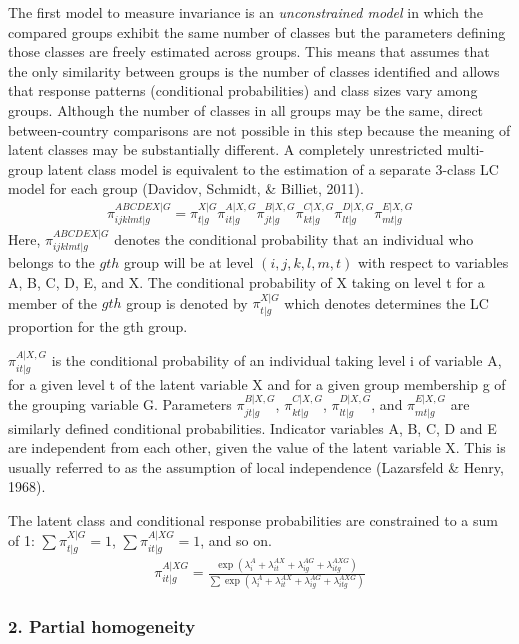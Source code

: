 \documentclass[12pt,a4paper,oneside]{reedthesis}
\begin{document}
The first model to measure invariance is an \emph{unconstrained model} in which the compared groups exhibit the same number of classes but the parameters defining those classes are freely estimated across groups. This means that assumes that the only similarity between groups is the number of classes identified and allows that response patterns (conditional probabilities) and class sizes vary among groups. Although the number of classes in all groups may be the same, direct between-country comparisons are not possible in this step because the meaning of latent classes may be substantially different. A completely unrestricted multi-group latent class model is equivalent to the estimation of a separate 3-class LC model for each group (Davidov, Schmidt, \& Billiet, 2011).
\begin{align}
\pi_{ijklmt|g}^{ABCDEX|G} = \pi_{t|g}^{X|G} \pi_{it|g}^{A|X,G} \pi_{jt|g}^{B|X,G} \pi_{kt|g}^{C|X,G} \pi_{lt|g}^{D|X,G} \pi_{mt|g}^{E|X,G}  
\end{align}
Here, \(\pi_{ijklmt|g}^{ABCDEX|G}\) denotes the conditional probability that an individual who belongs to the \(gth\) group will be at level \((i, j, k, l, m, t)\) with respect to variables A, B, C, D, E, and X. The conditional probability of X taking on level t for a member of the \(gth\) group is denoted by \(\pi_{t|g}^{X|G}\) which denotes determines the LC proportion for the gth group.

\(\pi_{it|g}^{A|X,G}\) is the conditional probability of an individual taking level i of variable A, for a given level t of the latent variable X and for a given group membership g of the grouping variable G. Parameters \(\pi_{jt|g}^{B|X,G}\), \(\pi_{kt|g}^{C|X,G}\), \(\pi_{lt|g}^{D|X,G}\), and \(\pi_{mt|g}^{E|X,G}\) are similarly defined conditional probabilities. Indicator variables A, B, C, D and E are independent from each other, given the value of the latent variable X. This is usually referred to as the assumption of local independence (Lazarsfeld \& Henry, 1968).

The latent class and conditional response probabilities are constrained to a sum of 1: \(\sum \pi_{t|g}^{X|G} =1\), \(\sum \pi_{it|g}^{A|XG} = 1\), and so on.
\begin{align}
\pi_{it|g}^{A|XG}=\frac{\exp(\lambda_i^A+\lambda_{it}^{AX}+\lambda_{ig}^{AG}+\lambda_{itg}^{AXG})}{\sum \exp(\lambda_i^A+\lambda_{it}^{AX}+\lambda_{ig}^{AG}+\lambda_{itg}^{AXG})}
\end{align}
\hypertarget{partial-homogeneity}{%
\subsubsection{2. Partial homogeneity}\label{partial-homogeneity}}
\end{document}
